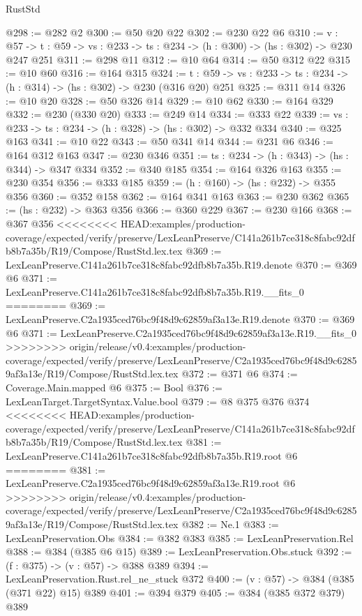 \begin{lexlean}{RustStd}
\begin{coremodule}
{\begin{coremodule}
@298 := @282 @2
@300 := @50 @20 @22
@302 := @230 @22 @6
@310 := {v : @57} ->
  {t : @59} -> {vs : @233} -> {ts : @234} -> (h : @300) -> (hs : @302) -> @230 @247 @251
@311 := @298 @11
@312 := @10 @64
@314 := @50 @312 @22
@315 := @10 @60
@316 := @164 @315
@324 := {t : @59} -> {vs : @233} -> {ts : @234} -> (h : @314) -> (hs : @302) -> @230 (@316 @20) @251
@325 := @311 @14
@326 := @10 @20
@328 := @50 @326 @14
@329 := @10 @62
@330 := @164 @329
@332 := @230 (@330 @20)
@333 := @249 @14
@334 := @333 @22
@339 := {vs : @233} -> {ts : @234} -> (h : @328) -> (hs : @302) -> @332 @334
@340 := @325 @163
@341 := @10 @22
@343 := @50 @341 @14
@344 := @231 @6
@346 := @164 @312 @163
@347 := @230 @346
@351 := {ts : @234} -> (h : @343) -> (hs : @344) -> @347 @334
@352 := @340 @185
@354 := @164 @326 @163
@355 := @230 @354
@356 := @333 @185
@359 := (h : @160) -> (hs : @232) -> @355 @356
@360 := @352 @158
@362 := @164 @341 @163
@363 := @230 @362
@365 := (hs : @232) -> @363 @356
@366 := @360 @229
@367 := @230 @166
@368 := @367 @356
<<<<<<<< HEAD:examples/production-coverage/expected/verify/preserve/LexLeanPreserve/C141a261b7ce318c8fabc92dfb8b7a35b/R19/Compose/RustStd.lex.tex
@369 := LexLeanPreserve.C141a261b7ce318c8fabc92dfb8b7a35b.R19.denote
@370 := @369 @6
@371 := LexLeanPreserve.C141a261b7ce318c8fabc92dfb8b7a35b.R19.__fits_0
========
@369 := LexLeanPreserve.C2a1935ced76bc9f48d9c62859af3a13e.R19.denote
@370 := @369 @6
@371 := LexLeanPreserve.C2a1935ced76bc9f48d9c62859af3a13e.R19.__fits_0
>>>>>>>> origin/release/v0.4:examples/production-coverage/expected/verify/preserve/LexLeanPreserve/C2a1935ced76bc9f48d9c62859af3a13e/R19/Compose/RustStd.lex.tex
@372 := @371 @6
@374 := Coverage.Main.mapped @6
@375 := Bool
@376 := LexLeanTarget.TargetSyntax.Value.bool
@379 := @8 @375 @376 @374
<<<<<<<< HEAD:examples/production-coverage/expected/verify/preserve/LexLeanPreserve/C141a261b7ce318c8fabc92dfb8b7a35b/R19/Compose/RustStd.lex.tex
@381 := LexLeanPreserve.C141a261b7ce318c8fabc92dfb8b7a35b.R19.root @6
========
@381 := LexLeanPreserve.C2a1935ced76bc9f48d9c62859af3a13e.R19.root @6
>>>>>>>> origin/release/v0.4:examples/production-coverage/expected/verify/preserve/LexLeanPreserve/C2a1935ced76bc9f48d9c62859af3a13e/R19/Compose/RustStd.lex.tex
@382 := Ne.{1}
@383 := LexLeanPreservation.Obs
@384 := @382 @383
@385 := LexLeanPreservation.Rel
@388 := @384 (@385 @6 @15)
@389 := LexLeanPreservation.Obs.stuck
@392 := (f : @375) -> (v : @57) -> @388 @389
@394 := LexLeanPreservation.Rust.rel_ne_stuck @372
@400 := (v : @57) -> @384 (@385 (@371 @22) @15) @389
@401 := @394 @379
@405 := @384 (@385 @372 @379) @389

\end{coremodule}}
\end{coremodule}
\end{lexlean}
